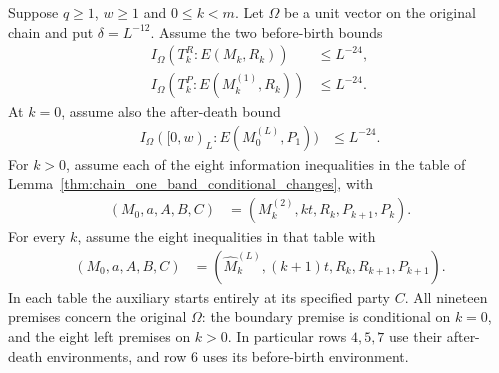 \begin{lemma}
    \label{thm:chain_conditional_local_circuits}
    \leanok
    Suppose $q\ge1$, $w\ge1$ and $0\le k<m$.
    Let $\Omega$ be a unit vector on the original chain and put
    $\delta=L^{-12}$. Assume the two before-birth bounds
    \begin{align}
        I_\Omega(T_k^R:E(M_k,R_k))       & \le L^{-24},
        \label{eq:chain_stage_remainder_information}    \\
        I_\Omega(T_k^P:E(M_k^{(1)},R_k)) & \le L^{-24}.
        \label{eq:chain_stage_block_information}
    \end{align}
    At $k=0$, assume also the after-death bound
    \begin{align}
        I_\Omega([0,w)_L:E(M_0^{(L)},P_1)) & \le L^{-24}.
        \label{eq:chain_stage_boundary_information}
    \end{align}
    For $k>0$, assume each of the eight information inequalities in the
    table of Lemma~\ref{thm:chain_one_band_conditional_changes}, with
    \begin{align}
        (M_0,a,A,B,C) & =(M_k^{(2)},kt,R_k,P_{k+1},P_k).
        \label{eq:chain_stage_left_information}
    \end{align}
    For every $k$, assume the eight inequalities in that table with
    \begin{align}
        (M_0,a,A,B,C) & =(\widehat M_k^{(L)},(k+1)t,R_k,R_{k+1},P_{k+1}).
        \label{eq:chain_stage_right_information}
    \end{align}
    In each table the auxiliary starts entirely at its specified party $C$.
    All nineteen premises concern the original $\Omega$: the boundary
    premise is conditional on $k=0$, and the eight left premises on $k>0$.
    In particular rows $4,5,7$ use their after-death environments,
    and row $6$ uses its before-birth environment.


\end{lemma}

